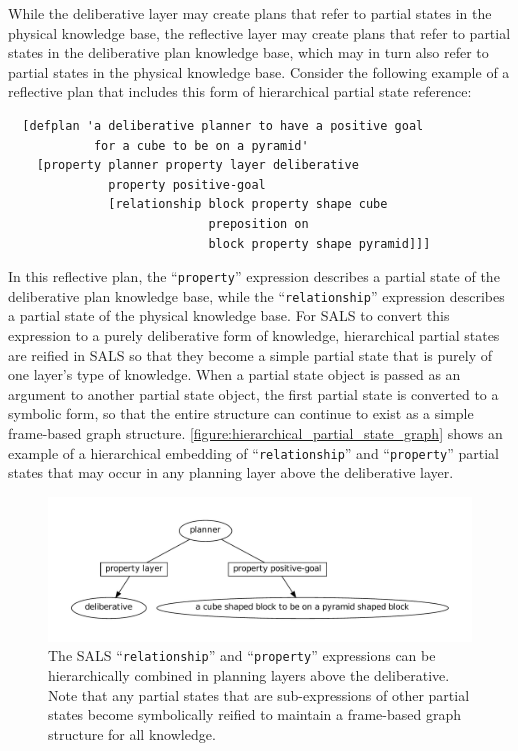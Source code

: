 While the deliberative layer may create plans that refer to partial
states in the physical knowledge base, the reflective layer may create
plans that refer to partial states in the deliberative plan knowledge
base, which may in turn also refer to partial states in the physical
knowledge base.  Consider the following example of a reflective plan
that includes this form of hierarchical partial state reference:
\begin{samepage}
\begin{Verbatim}
  [defplan 'a deliberative planner to have a positive goal
            for a cube to be on a pyramid'
    [property planner property layer deliberative
              property positive-goal
              [relationship block property shape cube
                            preposition on
                            block property shape pyramid]]]
\end{Verbatim}
\end{samepage}
In this reflective plan, the ``{\tt{property}}'' expression describes
a partial state of the deliberative plan knowledge base, while the
``{\tt{relationship}}'' expression describes a partial state of the
physical knowledge base.  For SALS to convert this expression to a
purely deliberative form of knowledge, hierarchical partial states are
reified in SALS so that they become a simple partial state that is
purely of one layer's type of knowledge.  When a partial state object
is passed as an argument to another partial state object, the first
partial state is converted to a symbolic form, so that the entire
structure can continue to exist as a simple frame-based graph
structure.  {\mbox{\autoref{figure:hierarchical_partial_state_graph}}}
shows an example of a hierarchical embedding of
``{\tt{relationship}}'' and ``{\tt{property}}'' partial states that
may occur in any planning layer above the deliberative layer.
\begin{figure}
\centering
\includegraphics[width=12cm]{gfx/hierarchical_partial_state_graph}
\caption[The SALS ``{\tt{relationship}}'' and ``{\tt{property}}''
  expressions can be hierarchically combined in planning layers above
  the deliberative.]{The SALS ``{\tt{relationship}}'' and
  ``{\tt{property}}'' expressions can be hierarchically combined in
  planning layers above the deliberative.  Note that any partial
  states that are sub-expressions of other partial states become
  symbolically reified to maintain a frame-based graph structure for
  all knowledge.}
\label{figure:hierarchical_partial_state_graph}
\end{figure}

